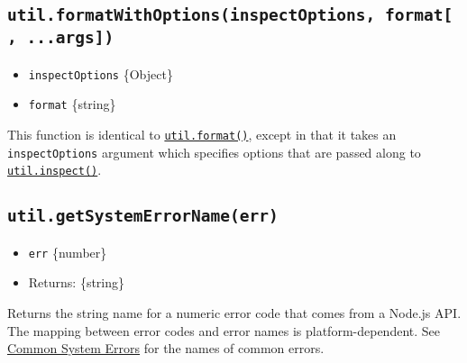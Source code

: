 \subsection{\texorpdfstring{\texttt{util.formatWithOptions(inspectOptions,\ format{[},\ ...args{]})}}{util.formatWithOptions(inspectOptions, format{[}, ...args{]})}}\label{util.formatwithoptionsinspectoptions-format-...args}

\begin{itemize}
\tightlist
\item
  \texttt{inspectOptions} \{Object\}
\item
  \texttt{format} \{string\}
\end{itemize}

This function is identical to
\hyperref[utilformatformat-args]{\texttt{util.format()}}, except in that
it takes an \texttt{inspectOptions} argument which specifies options
that are passed along to
\hyperref[utilinspectobject-options]{\texttt{util.inspect()}}.

\begin{Shaded}
\begin{Highlighting}[]
\NormalTok{(\{ }\OperatorTok{:} \NormalTok{ \}}\OperatorTok{,} \OperatorTok{,}\NormalTok{ \{ }\OperatorTok{:} \NormalTok{ \})}\OperatorTok{;}
\end{Highlighting}
\end{Shaded}

\subsection{\texorpdfstring{\texttt{util.getSystemErrorName(err)}}{util.getSystemErrorName(err)}}\label{util.getsystemerrornameerr}

\begin{itemize}
\tightlist
\item
  \texttt{err} \{number\}
\item
  Returns: \{string\}
\end{itemize}

Returns the string name for a numeric error code that comes from a
Node.js API. The mapping between error codes and error names is
platform-dependent. See \href{errors.md\#common-system-errors}{Common
System Errors} for the names of common errors.

